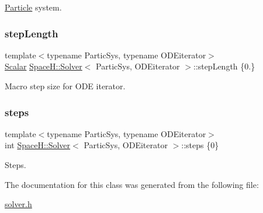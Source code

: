 \mbox{\hyperlink{struct_space_h_1_1_particle}{Particle}} system. 

\mbox{\label{class_space_h_1_1_solver_ab48648625039dbf5730a6499ecbe7ce2}} 
\subsubsection{\texorpdfstring{step\+Length}{stepLength}}
{\footnotesize\ttfamily template$<$typename Partic\+Sys, typename O\+D\+Eiterator$>$ \\
\mbox{\hyperlink{class_space_h_1_1_solver_aa0ade682bd07e13fef77e7dcbeb6b46a}{Scalar}} \mbox{\hyperlink{class_space_h_1_1_solver}{Space\+H\+::\+Solver}}$<$ Partic\+Sys, O\+D\+Eiterator $>$\+::step\+Length \{0.\}}



Macro step size for O\+DE iterator. 

\mbox{\label{class_space_h_1_1_solver_ae6798bb49a2bcc64657c6b7b6fb48181}} 
\subsubsection{\texorpdfstring{steps}{steps}}
{\footnotesize\ttfamily template$<$typename Partic\+Sys, typename O\+D\+Eiterator$>$ \\
int \mbox{\hyperlink{class_space_h_1_1_solver}{Space\+H\+::\+Solver}}$<$ Partic\+Sys, O\+D\+Eiterator $>$\+::steps \{0\}}



Steps. 



The documentation for this class was generated from the following file\+:\begin{DoxyCompactItemize}
\item 
\mbox{\hyperlink{solver_8h}{solver.\+h}}\end{DoxyCompactItemize}
